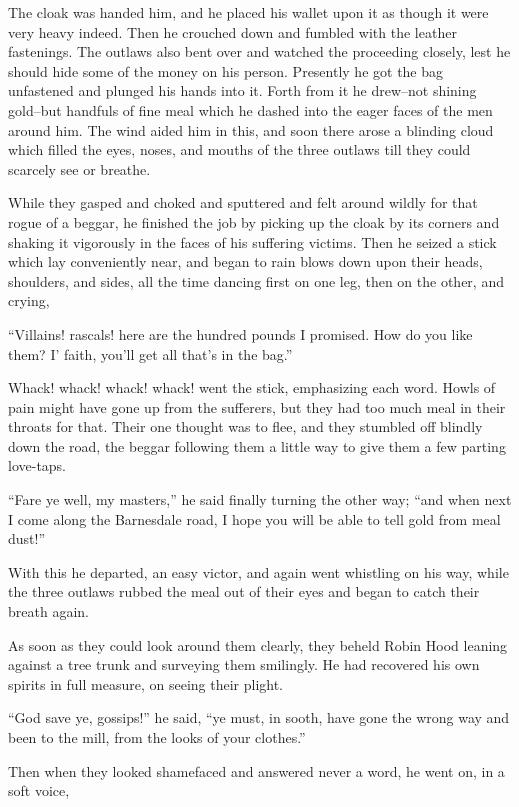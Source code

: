 The cloak was handed him, and he placed his wallet upon it as though it
were very heavy indeed. Then he crouched down and fumbled with the
leather fastenings. The outlaws also bent over and watched the
proceeding closely, lest he should hide some of the money on his person.
Presently he got the bag unfastened and plunged his hands into it. Forth
from it he drew--not shining gold--but handfuls of fine meal which he
dashed into the eager faces of the men around him. The wind aided him in
this, and soon there arose a blinding cloud which filled the eyes,
noses, and mouths of the three outlaws till they could scarcely see or
breathe.

While they gasped and choked and sputtered and felt around wildly for
that rogue of a beggar, he finished the job by picking up the cloak by
its corners and shaking it vigorously in the faces of his suffering
victims. Then he seized a stick which lay conveniently near, and began
to rain blows down upon their heads, shoulders, and sides, all the time
dancing first on one leg, then on the other, and crying,

``Villains! rascals! here are the hundred pounds I promised. How do you
like them? I' faith, you'll get all that's in the bag.''

Whack! whack! whack! whack! went the stick, emphasizing each word. Howls
of pain might have gone up from the sufferers, but they had too much
meal in their throats for that. Their one thought was to flee, and they
stumbled off blindly down the road, the beggar following them a little
way to give them a few parting love-taps.

``Fare ye well, my masters,'' he said finally turning the other way;
``and when next I come along the Barnesdale road, I hope you will be
able to tell gold from meal dust!''

With this he departed, an easy victor, and again went whistling on his
way, while the three outlaws rubbed the meal out of their eyes and began
to catch their breath again.

As soon as they could look around them clearly, they beheld Robin Hood
leaning against a tree trunk and surveying them smilingly. He had
recovered his own spirits in full measure, on seeing their plight.

``God save ye, gossips!'' he said, ``ye must, in sooth, have gone the
wrong way and been to the mill, from the looks of your clothes.''

Then when they looked shamefaced and answered never a word, he went on,
in a soft voice,

